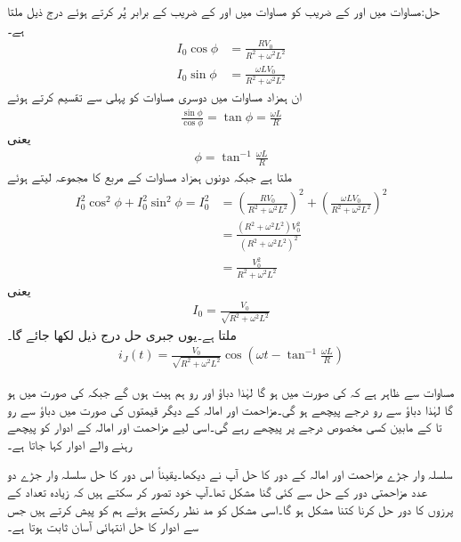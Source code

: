 حل:مساوات  میں  اور  کے  ضریب  کو مساوات  میں  اور  کے  ضریب  کے برابر پُر کرتے ہوئے درج ذیل ملتا ہے۔
\begin{align*}
I_0 \cos \phi&=\frac{R V_0}{R^2+\omega^2 L^2}\\
I_0 \sin \phi&=\frac{\omega L V_0}{R^2+\omega^2 L^2}
\end{align*}
ان ہمزاد مساوات میں دوسری مساوات کو پہلی سے تقسیم کرتے ہوئے
\begin{align*}
\frac{\sin \phi}{\cos \phi}=\tan \phi=\frac{\omega L}{R}
\end{align*}
یعنی
\begin{align}
\phi=\tan^{-1}{\frac{\omega L}{R}}
\end{align}
ملتا ہے جبکہ دونوں ہمزاد مساوات کے مربع کا مجموعہ لیتے ہوئے
\begin{align*}
I_0^2 \cos^2 \phi+I_0^2 \sin^2 \phi=I_0^2&=\left(\frac{R V_0}{R^2+\omega^2 L^2}\right)^2+\left(\frac{\omega L V_0}{R^2+\omega^2 L^2}\right)^2 \\
&=\frac{(R^2+\omega^2 L^2)V_0^2}{(R^2+\omega^2 L^2)^2}\\
&=\frac{V_0^2}{R^2+\omega^2 L^2}
\end{align*}
یعنی
\begin{align}
I_0=\frac{V_0}{\sqrt{R^2+\omega^2 L^2}}
\end{align}
ملتا ہے۔یوں جبری حل درج ذیل لکھا جائے گا۔
\begin{align}\label{مساوات_بدلتا_جبری_حل_امالہ_مزاحمت}
i_J(t)=\frac{V_0}{\sqrt{R^2+\omega^2 L^2}} \cos \left(\omega t -\tan^{-1}{\frac{\omega L}{R}}\right)
\end{align}

مساوات  سے ظاہر ہے کہ  کی صورت میں  ہو گا لہٰذا دباؤ اور رو ہم ہیت ہوں گے جبکہ  کی صورت میں  ہو گا لہٰذا دباؤ سے رو  درجے پیچھے ہو گی۔مزاحمت اور امالہ کے دیگر قیمتوں کی صورت میں دباؤ سے رو  تا  کے مابین کسی مخصوص  درجے پر پیچھے رہے گی۔اسی لیے مزاحمت اور امالہ کے ادوار کو پیچھے رہنے والے ادوار کہا جاتا ہے۔

سلسلہ وار جڑے مزاحمت اور امالہ کے دور کا حل آپ نے دیکھا۔یقیناً اس دور کا حل سلسلہ وار جڑے دو عدد مزاحمتی دور کے حل سے کئی گنا مشکل تھا۔آپ خود تصور کر سکتے ہیں کہ زیادہ تعداد کے پرزوں کا دور حل کرنا کتنا مشکل ہو گا۔اسی مشکل کو مد نظر رکھتے ہوئے ہم  کو پیش کرتے ہیں جس سے ادوار کا حل انتہائی آسان ثابت ہوتا ہے۔

